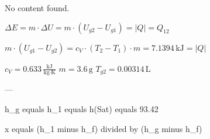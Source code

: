 No content found.

\( \Delta E = m \cdot \Delta U = m \cdot (U_{g2} - U_{g1}) = |Q| = Q_{12} \)  

\( m \cdot (U_{g1} - U_{g2}) = c_V \cdot (T_2 - T_1) \cdot m = 7.1394 \, \text{kJ} = |Q| \)  

\( c_V = 0.633 \, \frac{\text{kJ}}{\text{kg·K}} \)  
\( m = 3.6 \, \text{g} \)  
\( T_{g2} = 0.00314 \, \text{L} \)  

---

h_g equals h_1 equals h(Sat) equals 93.42  

x equals (h_1 minus h_f) divided by (h_g minus h_f)
